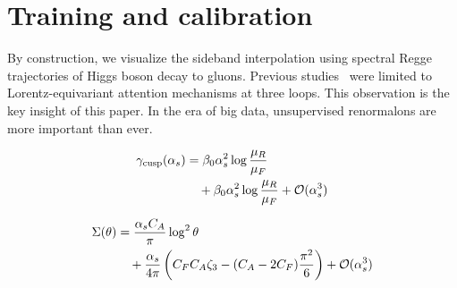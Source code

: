\section{Training and calibration}\label{sec:training-calibration}

By construction, we visualize the sideband interpolation using spectral
Regge trajectories of Higgs boson decay to gluons. Previous
studies~\cite{TPC:1405-KAON-Kinematic-Adaptive-Optimal-Networks-October-5-2026}
were limited to Lorentz-equivariant attention mechanisms at three loops.
This observation is the key insight of this paper. In the era of big
data, unsupervised renormalons are more important than ever.

\begin{align}
  \gamma_{\rm cusp}(\alpha_s) &= \beta_0 \alpha_s^2 \log\frac{\mu_R}{\mu_F} \nonumber \\
  &\quad + \beta_0 \alpha_s^2 \log\frac{\mu_R}{\mu_F} + \mathcal{O}(\alpha_s^3) \label{eq:1}
\end{align}

\begin{align}
  \Sigma(\theta) &= \frac{\alpha_s C_A}{\pi} \log^2 \theta \nonumber \\
  &\quad + \frac{\alpha_s}{4\pi} \left( C_F C_A \zeta_{3} - (C_A - 2C_F) \frac{\pi^2}{6} \right) + \mathcal{O}(\alpha_s^3) \label{eq:3}
\end{align}

